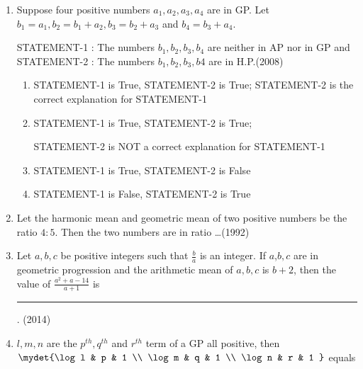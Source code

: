 \begin{enumerate}[label=\thesubsection.\arabic*,ref=\thesubsection.\theenumi]

\item Suppose four positive numbers $a_{1},a_{2},a_{3},a_{4}$ are in GP. Let $b_{1} = a_{1}, b_{2} = b_{1} + a_{2}, b_{3} = b_{2} + a_{3}$ and $b_{4} = b_{3} + a_{4}$.

STATEMENT-1 : The numbers $b_{1},b_{2},b_{3},b_{4}$ are neither in AP nor in GP and STATEMENT-2 : The numbers $b_{1},b_{2},b_{3},b{4}$ are in H.P.\hfill(2008)

\begin{enumerate}
    

\item STATEMENT-1 is True, STATEMENT-2 is True; STATEMENT-2 is the correct explanation for STATEMENT-1

\item STATEMENT-1 is True, STATEMENT-2 is True;

STATEMENT-2 is NOT a correct explanation for STATEMENT-1

\item STATEMENT-1 is True, STATEMENT-2 is False

\item STATEMENT-1 is False, STATEMENT-2 is True
\end{enumerate}
		  \item Let the harmonic mean and geometric mean of two positive numbers be the ratio $4:5$. Then the two numbers are in 
			  ratio \dots\hfill{(1992)}
          

   \item Let $a,b,c$ be positive integers such that $\frac{b}{a}$ is an integer. If $a$,$b,c$ are in geometric progression and the arithmetic mean of $a,b,c$ is $b + 2$, then the value of $\frac{a^{2} + a - 14}{a + 1}$ is \rule{1cm}{0.1pt}.
	   \hfill(2014)

\item {$l, m, n$ are the $p^{th}, q^{th}$ and $r^{th}$ term of a GP all positive, then $\mydet{\log l & p & 1 \\ \log m & q & 1 \\ \log n & r & 1 }$ equals}


\end{enumerate}
